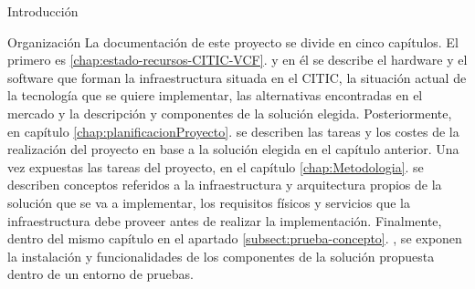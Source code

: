 \begin{chapter}{Introducción}
\begin{section}{Organización}
    La documentación de este proyecto se divide en cinco capítulos. El primero es \ref{chap:estado-recursos-CITIC-VCF}. y en él se describe el hardware y el software que forman la infraestructura situada en el CITIC, la situación actual de la tecnología que se quiere implementar, las alternativas encontradas en el mercado y la descripción y componentes de la solución elegida. Posteriormente, en capítulo \ref{chap:planificacionProyecto}. se describen las tareas y los costes de la realización del proyecto en base a la solución elegida en el capítulo anterior. Una vez expuestas las tareas del proyecto, en el capítulo \ref{chap:Metodologia}. se describen conceptos referidos a la infraestructura y arquitectura propios de la solución que se va a implementar, los requisitos físicos y servicios que la infraestructura debe proveer antes de realizar la implementación. Finalmente, dentro del mismo capítulo en el apartado \ref{subsect:prueba-concepto}. , se exponen la instalación y funcionalidades de los componentes de la solución propuesta dentro de un entorno de pruebas.
\end{section}

\end{chapter}